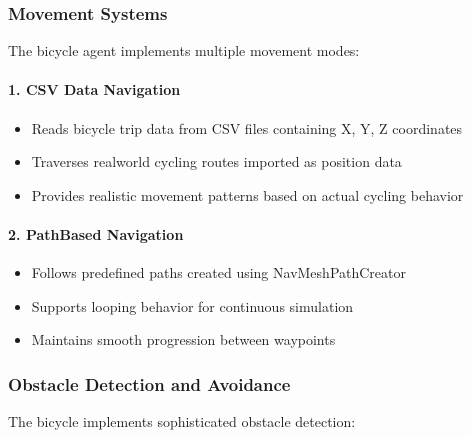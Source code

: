 \documentclass[letterpaper,10pt,english]{jupyterBook}
\begin{document}
\subsubsection{Movement Systems}
\label{\detokenize{Bicycle Agent:movement-systems}}
\sphinxAtStartPar
The bicycle agent implements multiple movement modes:


\paragraph{1. CSV Data Navigation}
\label{\detokenize{Bicycle Agent:csv-data-navigation}}\begin{itemize}
\item {} 
\sphinxAtStartPar
Reads bicycle trip data from CSV files containing X, Y, Z coordinates

\item {} 
\sphinxAtStartPar
Traverses real\sphinxhyphen{}world cycling routes imported as position data

\item {} 
\sphinxAtStartPar
Provides realistic movement patterns based on actual cycling behavior

\end{itemize}


\paragraph{2. Path\sphinxhyphen{}Based Navigation}
\label{\detokenize{Bicycle Agent:path-based-navigation}}\begin{itemize}
\item {} 
\sphinxAtStartPar
Follows predefined paths created using NavMeshPathCreator

\item {} 
\sphinxAtStartPar
Supports looping behavior for continuous simulation

\item {} 
\sphinxAtStartPar
Maintains smooth progression between waypoints

\end{itemize}


\subsubsection{Obstacle Detection and Avoidance}
\label{\detokenize{Bicycle Agent:obstacle-detection-and-avoidance}}
\sphinxAtStartPar
The bicycle implements sophisticated obstacle detection:
\end{document}
